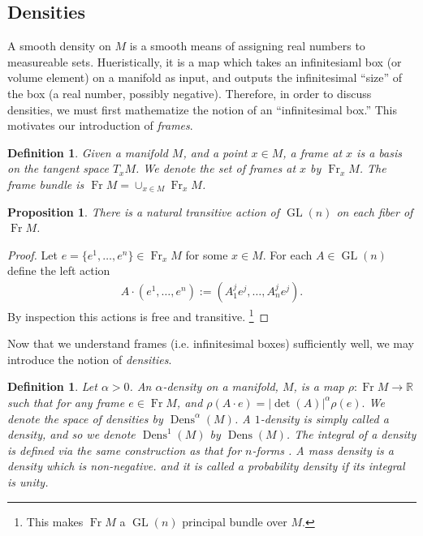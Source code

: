 \documentclass[letterpaper, 10 pt, conference]{ieeeconf}
\newcommand{\R}{\mathbb{R}}
\newtheorem{defn}[thm]{Definition}
\newtheorem{prop}[thm]{Proposition}
\DeclareMathOperator{\Fr}{Fr}
\DeclareMathOperator{\GL}{GL}
\DeclareMathOperator{\Dens}{Dens}
\begin{document}
\subsection{Densities}
  A smooth density on $M$ is a smooth means of
  assigning real numbers to measureable sets.
  Hueristically, it is a map which
  takes an infinitesiaml box (or volume element)
  on a manifold as input, and outputs the infinitesimal ``size''
  of the box (a real number, possibly negative).
  Therefore, in order to discuss densities,
  we must first mathematize the notion of an ``infinitesimal box.''
  This motivates our introduction of \emph{frames}.
  \begin{defn}
  \label{eq:frame_bundle}
    Given a manifold $M$, and a point $x \in M$,
    a \emph{frame at $x$} is a basis on the tangent space $T_x M$.
    We denote the set of frames at $x$ by $\Fr_x M$.
    The frame bundle is $\Fr M = \cup_{x \in M} \Fr_x M$.
  \end{defn}

  \begin{prop}
    There is a natural transitive
    action of $\GL(n)$ on each fiber of $\Fr M$.
  \end{prop}

  \begin{proof}
    Let $e = \{ e^1,\dots,e^n \} \in \Fr_x M$ for some $x \in M$.
    For each $A \in \GL(n)$ define the left action
    \begin{align*}
      A \cdot (e^1,\dots,e^n) := (A^j_1 e^j , \dots, A_n^j e^j ). 
    \end{align*}
    By inspection this actions is free and transitive.
    \footnote{This makes $\Fr M$ a $\GL(n)$ principal bundle over $M$.}
  \end{proof}

  Now that we understand frames (i.e. infinitesimal boxes)
  sufficiently well, we may introduce the notion of \emph{densities}.

  \begin{defn}
    \label{eq:density}
    Let $\alpha > 0$.
    An $\alpha$-\emph{density} on a manifold, $M$, is a map
    $\rho:\Fr M \to \R$ such that
    for any frame $e \in \Fr M$, and
    $
      \rho( A \cdot e ) =  | \det(A) |^\alpha \rho(e).
    $
    We denote the space of densities by $\Dens^\alpha(M)$.
    A $1$-density is simply called a \emph{density}, and
    so we denote $\Dens^1(M)$ by $\Dens(M)$.
    The integral of a density is defined via the same construction as that
    for $n$-forms \cite[\S 14]{Lee2006}.
    A \emph{mass density} is a density which is non-negative.
    and it is called a \emph{probability density} if its integral is
    unity.
  \end{defn}
\end{document}
